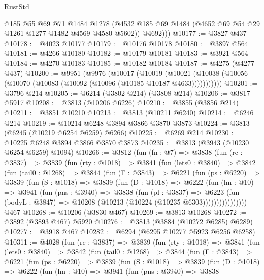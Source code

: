 \begin{lexlean}{RustStd}
\begin{coremodule}
          @185
          @55
          @69
          @71
          @1484
          @1278
          (@4532 @185 @69 @1484 (@4652 @69 @54 @29 @1261 @1277 @1482 @4569 @4580 @5602))
          @4692)))
@10177 := @3827 @437
@10178 := @4023 @10177
@10179 := @10176 @10178
@10180 := @3897 @564
@10181 := @4266 @10180
@10182 := @10179 @10181
@10183 := @3921 @564
@10184 := @4270 @10183
@10185 := @10182 @10184
@10187 := @4275 (@4277 @437)
@10200 := @9951
    (@9976
      (@10017
        (@10019
          (@10021 (@10038 (@10056 (@10070 (@10083 (@10092 (@10096 (@10185 @10187 @4633)))))))))))
@10201 := @3796 @214
@10205 := @6214 (@3802 @214) (@3808 @214)
@10206 := @3817 @5917
@10208 := @3813 (@10206 @6226)
@10210 := @3855 (@3856 @214)
@10211 := @3851 @10210
@10213 := @3813 (@10211 @6240)
@10214 := @6246 @214
@10219 := @10214 @6248 @3894 @3866 @3870 @3873
@10224 := @3813 (@6245 (@10219 @6254 @6259) @6266)
@10225 := @6269 @214
@10230 := @10225 @6248 @3894 @3866 @3870 @3873
@10235 := @3813 (@3943 (@10230 @6254 @6259) @1094)
@10266 := @3812
    (fun (fn : @7) =>
    @3838
      (fun (rc : @3837) =>
      @3839
        (fun (rty : @1018) =>
        @3841
          (fun (lets0 : @3840) =>
          @3842
            (fun (tail0 : @1268) =>
            @3844
              (fun (Γ : @3843) =>
              @6221
                (fun (ps : @6220) =>
                @3839
                  (fun (S : @1018) =>
                  @3839
                    (fun (D : @1018) =>
                    @6222
                      (fun (hn : @10) =>
                      @3941
                        (fun (pns : @3940) =>
                        @3838
                          (fun (pl : @3837) =>
                          @6223
                            (fun (bodyL : @3847) =>
                            @10208 (@10213 (@10224 (@10235 @6303))))))))))))))))
    @467
@10268 := @10206 (@3830 @467)
@10269 := @3813 @10268
@10272 := @3892 (@3893 @467) @5920
@10276 := @3813 (@3884 (@10272 @6285) @6289)
@10277 := @3918 @467
@10282 := @6294 (@6295 @10277 @5923 @6256 @6258)
@10311 := @4028
    (fun (rc : @3837) =>
    @3839
      (fun (rty : @1018) =>
      @3841
        (fun (lets0 : @3840) =>
        @3842
          (fun (tail0 : @1268) =>
          @3844
            (fun (Γ : @3843) =>
            @6221
              (fun (ps : @6220) =>
              @3839
                (fun (S : @1018) =>
                @3839
                  (fun (D : @1018) =>
                  @6222
                    (fun (hn : @10) =>
                    @3941
                      (fun (pns : @3940) =>
                      @3838

\end{coremodule}
\end{lexlean}
